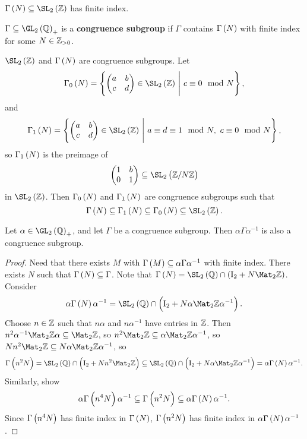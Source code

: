 \begin{note*}
$ \Gamma\br{N} \subseteq \SL_2\br{\ZZ} $ has finite index.
\end{note*}

\begin{definition}
$ \Gamma \subseteq \GL_2\br{\QQ}_+ $ is a \textbf{congruence subgroup} if $ \Gamma $ contains $ \Gamma\br{N} $ with finite index for some $ N \in \mathbb{Z}_{> 0} $.
\end{definition}

\begin{example*}
$ \SL_2\br{\ZZ} $ and $ \Gamma\br{N} $ are congruence subgroups. Let
$$ \Gamma_0\br{N} = \cbr{\twobytwo{a}{b}{c}{d} \in \SL_2\br{\ZZ} \st c \equiv 0 \mod N}, $$
and
$$ \Gamma_1\br{N} = \cbr{\twobytwo{a}{b}{c}{d} \in \SL_2\br{\ZZ} \st a \equiv d \equiv 1 \mod N, \ c \equiv 0 \mod N}, $$
so $ \Gamma_1\br{N} $ is the preimage of
$$ \twobytwo{1}{b}{0}{1} \subseteq \SL_2\br{\ZZ / N\ZZ} $$
in $ \SL_2\br{\ZZ} $. Then $ \Gamma_0\br{N} $ and $ \Gamma_1\br{N} $ are congruence subgroups such that
$$ \Gamma\br{N} \subseteq \Gamma_1\br{N} \subseteq \Gamma_0\br{N} \subseteq \SL_2\br{\ZZ}. $$
\end{example*}

\begin{proposition}
Let $ \alpha \in \GL_2\br{\QQ}_+ $, and let $ \Gamma $ be a congruence subgroup. Then $ \alpha\Gamma\alpha^{-1} $ is also a congruence subgroup.
\end{proposition}

\begin{proof}
Need that there exists $ M $ with $ \Gamma\br{M} \subseteq \alpha\Gamma\alpha^{-1} $ with finite index. There exists $ N $ such that $ \Gamma\br{N} \subseteq \Gamma $. Note that $ \Gamma\br{N} = \SL_2\br{\QQ} \cap \br{\I_2 + N\Mat_2 \ZZ} $. Consider
$$ \alpha\Gamma\br{N}\alpha^{-1} = \SL_2\br{\QQ} \cap \br{\I_2 + N\alpha\Mat_2 \ZZ\alpha^{-1}}. $$
Choose $ n \in \mathbb{Z} $ such that $ n\alpha $ and $ n\alpha^{-1} $ have entries in $ \mathbb{Z} $. Then $ n^2\alpha^{-1}\Mat_2 \ZZ\alpha \subseteq \Mat_2 \ZZ $, so $ n^2\Mat_2 \ZZ \subseteq \alpha\Mat_2 \ZZ\alpha^{-1} $, so $ Nn^2\Mat_2 \ZZ \subseteq N\alpha\Mat_2 \ZZ\alpha^{-1} $, so
$$ \Gamma\br{n^2N} = \SL_2\br{\QQ} \cap \br{\I_2 + Nn^2\Mat_2 \ZZ} \subseteq \SL_2\br{\QQ} \cap \br{\I_2 + N\alpha\Mat_2 \ZZ\alpha^{-1}} = \alpha\Gamma\br{N}\alpha^{-1}. $$
Similarly, show
$$ \alpha\Gamma\br{n^4N}\alpha^{-1} \subseteq \Gamma\br{n^2N} \subseteq \alpha\Gamma\br{N}\alpha^{-1}. $$
Since $ \Gamma\br{n^4N} $ has finite index in $ \Gamma\br{N} $, $ \Gamma\br{n^2N} $ has finite index in $ \alpha\Gamma\br{N}\alpha^{-1} $.
\end{proof}

